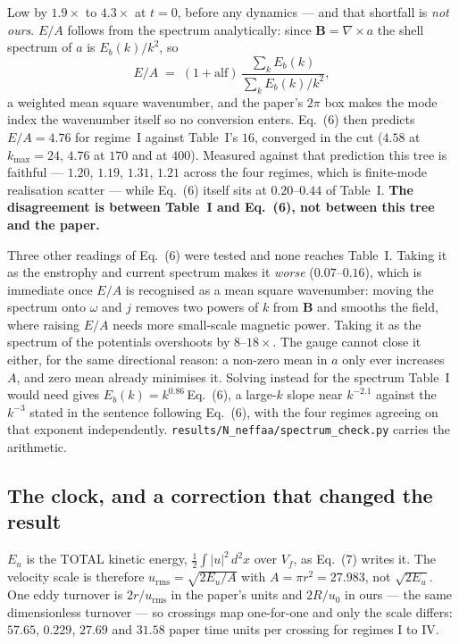 \documentclass[11pt,a4paper]{article}
\newcommand{\code}[1]{\texttt{\small #1}}
\begin{document}
\noindent Low by $1.9\times$ to $4.3\times$ at $t=0$, before any dynamics --- and
that shortfall is \emph{not ours}. $E/A$ follows from the spectrum analytically:
since $\mathbf{B}=\nabla\times a$ the shell spectrum of $a$ is $E_b(k)/k^2$, so
\begin{equation*}
  E/A \;=\; (1+\mathrm{alf})\,\frac{\sum_k E_b(k)}{\sum_k E_b(k)/k^2},
\end{equation*}
a weighted mean square wavenumber, and the paper's $2\pi$ box makes the mode index
the wavenumber itself so no conversion enters. Eq.~(6) then predicts
$E/A = 4.76$ for regime~I against Table~I's $16$, converged in the cut ($4.58$ at
$k_{\max}=24$, $4.76$ at $170$ and at $400$). Measured against that prediction
this tree is faithful --- $1.20$, $1.19$, $1.31$, $1.21$ across the four regimes,
which is finite-mode realisation scatter --- while Eq.~(6) itself sits at
$0.20$--$0.44$ of Table~I. \textbf{The disagreement is between Table~I and
Eq.~(6), not between this tree and the paper.}

Three other readings of Eq.~(6) were tested and none reaches Table~I. Taking it
as the enstrophy and current spectrum makes it \emph{worse} ($0.07$--$0.16$),
which is immediate once $E/A$ is recognised as a mean square wavenumber: moving
the spectrum onto $\omega$ and $j$ removes two powers of $k$ from $\mathbf{B}$ and
smooths the field, where raising $E/A$ needs more small-scale magnetic power.
Taking it as the spectrum of the potentials overshoots by $8$--$18\times$. The
gauge cannot close it either, for the same directional reason: a non-zero mean in
$a$ only ever increases $A$, and zero mean already minimises it. Solving instead
for the spectrum Table~I would need gives $E_b(k) = k^{0.86}\,$Eq.~(6), a large-$k$
slope near $k^{-2.1}$ against the $k^{-3}$ stated in the sentence following
Eq.~(6), with the four regimes agreeing on that exponent independently.
\code{results/N\_neffaa/spectrum\_check.py} carries the arithmetic.

\subsection{The clock, and a correction that changed the result}

$E_u$ is the TOTAL kinetic energy, $\tfrac12\int|u|^2\,d^2x$ over $V_f$, as Eq.~(7)
writes it. The velocity scale is therefore $u_{\mathrm{rms}}=\sqrt{2E_u/A}$ with
$A=\pi r^2=27.983$, not $\sqrt{2E_u}$. One eddy turnover is $2r/u_{\mathrm{rms}}$
in the paper's units and $2R/u_0$ in ours --- the same dimensionless turnover ---
so crossings map one-for-one and only the scale differs: $57.65$, $0.229$, $27.69$
and $31.58$ paper time units per crossing for regimes I to IV.
\end{document}
